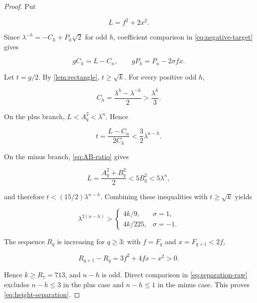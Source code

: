 \begin{proof}
Put

\begin{equation}
 L=f^2+2x^2.
\end{equation}

Since $\lambda^{-h}=-C_h+P_h\sqrt2$ for odd $h$, coefficient comparison in
\cref{eq:negative-target} gives

\begin{equation}
 gC_h=L-C_n,
 \qquad
 gP_h=P_n-2\sigma fx.
 \label{eq:coefficient-height}
\end{equation}

Let $t=g/2$. By \cref{lem:rectangle}, $t\geqslant\sqrt{k}$. For every
positive odd $h$,

\begin{equation}
 C_h=\frac{\lambda^h-\lambda^{-h}}2>\frac{\lambda^h}{3}.
 \label{eq:Ch-lower}
\end{equation}

On the plus branch, $L<A_q^2<\lambda^n$. Hence

\begin{equation}
 t=\frac{L-C_n}{2C_h}<\frac32\lambda^{n-h}.
\end{equation}

On the minus branch, \cref{eq:AB-ratio} gives

\begin{equation}
 L=\frac{A_q^2+B_q^2}{2}<5B_q^2<5\lambda^n,
\end{equation}

and therefore $t<(15/2)\lambda^{n-h}$. Combining these inequalities with
$t\geqslant\sqrt{k}$ yields

\begin{equation}
 \lambda^{2(n-h)}>
 \begin{cases}
 4k/9,&\sigma=1,\\
 4k/225,&\sigma=-1.
 \end{cases}
 \label{eq:separation-raw}
\end{equation}

The sequence $R_q$ is increasing for $q\geqslant3$: with
$f=F_q$ and $x=F_{q+1}<2f$,

\begin{equation}
 R_{q+1}-R_q=3f^2+4fx-x^2>0.
\end{equation}

Hence $k\geqslant R_7=713$, and $n-h$ is odd. Direct comparison in
\cref{eq:separation-raw} excludes $n-h\leqslant3$ in the plus case and
$n-h\leqslant1$ in the minus case. This proves
\cref{eq:height-separation}.
\end{proof}

